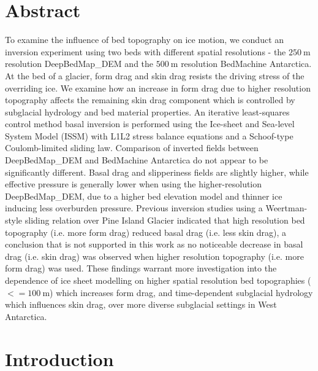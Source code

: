 
\section*{Abstract}

To examine the influence of bed topography on ice motion, we conduct an inversion experiment using two beds with different spatial resolutions - the $\SI{250}{\metre}$ resolution DeepBedMap\_DEM and the $\SI{500}{\metre}$ resolution BedMachine Antarctica.
At the bed of a glacier, form drag and skin drag resists the driving stress of the overriding ice.
We examine how an increase in form drag due to higher resolution topography affects the remaining skin drag component which is controlled by subglacial hydrology and bed material properties.
An iterative least-squares control method basal inversion is performed using the Ice-sheet and Sea-level System Model (\gls{ISSM}) with L1L2 stress balance equations and a Schoof-type Coulomb-limited sliding law.
Comparison of inverted fields between DeepBedMap\_DEM and BedMachine Antarctica do not appear to be significantly different.
Basal drag and slipperiness fields are slightly higher, while effective pressure is generally lower when using the higher-resolution DeepBedMap\_DEM, due to a higher bed elevation model and thinner ice inducing less overburden pressure.
Previous inversion studies using a Weertman-style sliding relation over Pine Island Glacier indicated that high resolution bed topography (i.e. more form drag) reduced basal drag (i.e. less skin drag), a conclusion that is not supported in this work as no noticeable decrease in basal drag (i.e. skin drag) was observed when higher resolution topography (i.e. more form drag) was used.
These findings warrant more investigation into the dependence of ice sheet modelling on higher spatial resolution bed topographies ($<= \SI{100}{\metre}$) which increases form drag, and time-dependent subglacial hydrology which influences skin drag, over more diverse subglacial settings in West Antarctica.


\section{Introduction}

